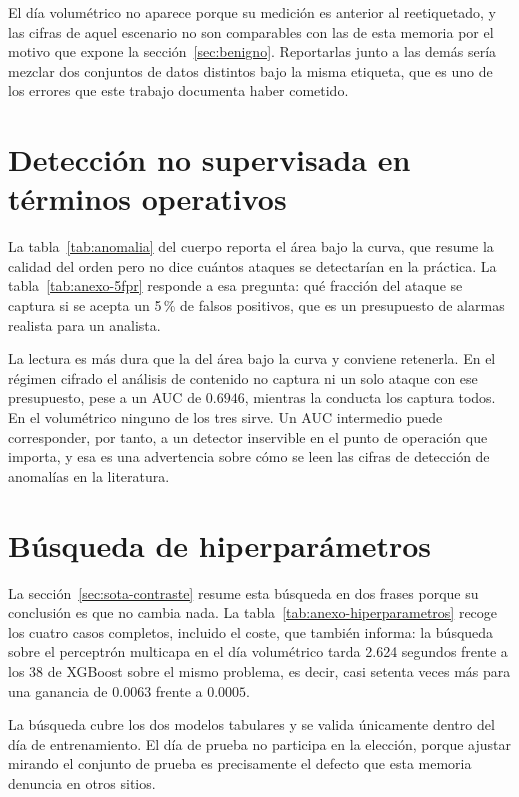 El día volumétrico no aparece porque su medición es anterior al reetiquetado, y
las cifras de aquel escenario no son comparables con las de esta memoria por el
motivo que expone la sección~\ref{sec:benigno}. Reportarlas junto a las demás
sería mezclar dos conjuntos de datos distintos bajo la misma etiqueta, que es
uno de los errores que este trabajo documenta haber cometido.


\section{Detección no supervisada en términos operativos}

La tabla~\ref{tab:anomalia} del cuerpo reporta el área bajo la curva, que resume
la calidad del orden pero no dice cuántos ataques se detectarían en la práctica.
La tabla~\ref{tab:anexo-5fpr} responde a esa pregunta: qué fracción del ataque
se captura si se acepta un 5\,\% de falsos positivos, que es un presupuesto de
alarmas realista para un analista.

La lectura es más dura que la del área bajo la curva y conviene retenerla. En el
régimen cifrado el análisis de contenido no captura ni un solo ataque con ese
presupuesto, pese a un AUC de $0.6946$, mientras la conducta los captura todos.
En el volumétrico ninguno de los tres sirve. Un AUC intermedio puede
corresponder, por tanto, a un detector inservible en el punto de operación que
importa, y esa es una advertencia sobre cómo se leen las cifras de detección de
anomalías en la literatura.


\section{Búsqueda de hiperparámetros}

La sección~\ref{sec:sota-contraste} resume esta búsqueda en dos frases porque su
conclusión es que no cambia nada. La tabla~\ref{tab:anexo-hiperparametros}
recoge los cuatro casos completos, incluido el coste, que también informa: la
búsqueda sobre el perceptrón multicapa en el día volumétrico tarda 2.624
segundos frente a los 38 de XGBoost sobre el mismo problema, es decir, casi
setenta veces más para una ganancia de $0.0063$ frente a $0.0005$.

La búsqueda cubre los dos modelos tabulares y se valida únicamente dentro del
día de entrenamiento. El día de prueba no participa en la elección, porque
ajustar mirando el conjunto de prueba es precisamente el defecto que esta
memoria denuncia en otros sitios.



